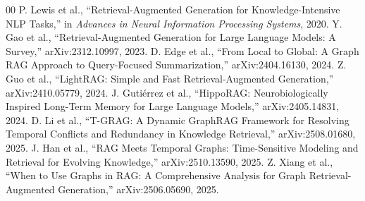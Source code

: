 \begin{thebibliography}{00}
 P. Lewis et al., ``Retrieval-Augmented Generation for Knowledge-Intensive NLP Tasks,'' in \textit{Advances in Neural Information Processing Systems}, 2020.
 Y. Gao et al., ``Retrieval-Augmented Generation for Large Language Models: A Survey,'' arXiv:2312.10997, 2023.
 D. Edge et al., ``From Local to Global: A Graph RAG Approach to Query-Focused Summarization,'' arXiv:2404.16130, 2024.
 Z. Guo et al., ``LightRAG: Simple and Fast Retrieval-Augmented Generation,'' arXiv:2410.05779, 2024.
 J. Guti\'errez et al., ``HippoRAG: Neurobiologically Inspired Long-Term Memory for Large Language Models,'' arXiv:2405.14831, 2024.
 D. Li et al., ``T-GRAG: A Dynamic GraphRAG Framework for Resolving Temporal Conflicts and Redundancy in Knowledge Retrieval,'' arXiv:2508.01680, 2025.
 J. Han et al., ``RAG Meets Temporal Graphs: Time-Sensitive Modeling and Retrieval for Evolving Knowledge,'' arXiv:2510.13590, 2025.
 Z. Xiang et al., ``When to Use Graphs in RAG: A Comprehensive Analysis for Graph Retrieval-Augmented Generation,'' arXiv:2506.05690, 2025.
\end{thebibliography}
